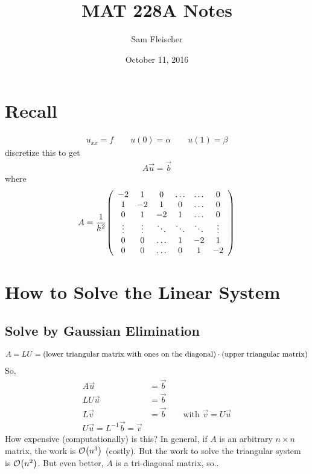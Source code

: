 \documentclass{article}
\title{MAT 228A Notes}
\author{Sam Fleischer}
\date{October 11, 2016}
\begin{document}
    \maketitle

    \section{Recall}
        \begin{align}
            u_{xx} = f \qquad u(0) = \alpha \qquad u(1) = \beta
        \end{align}
        discretize this to get
        \begin{align}
            A\vec{u} = \vec{b}
        \end{align}
        where
        \begin{align}
            A = \frac{1}{h^2}\qty(\begin{array}{cccccc}
                -2 & 1 & 0 & \dots & \dots & 0 \\
                1 & -2 & 1 & 0 & \dots & 0 \\
                0 & 1 & -2 & 1 & \dots & 0 \\
                \vdots & \vdots & \ddots & \ddots & \ddots & \vdots \\
                0 & 0 & \dots & 1 & -2 & 1 \\
                0 & 0 & \dots & 0 & 1 & -2
            \end{array})
        \end{align}

    \section{How to Solve the Linear System}
        \subsection{Solve by Gaussian Elimination}
            \begin{align}
                A = LU = \qty(\text{lower triangular matrix with ones on the diagonal})\cdot\qty(\text{upper triangular matrix})
            \end{align}
            So,
            \begin{align}
                A\vec{u} &= \vec{b} \\
                LU\vec{u} &= \vec{b} \\
                L\vec{v} &= \vec{b} \qquad \text{with } \vec{v} = U\vec{u} \\
                U\vec{u} = L^{-1}\vec{b} = \vec{v}
            \end{align}
            How expensive (computationally) is this?  In general, if $A$ is an arbitrary $n\times n$ matrix, the work is $\order{n^3}$ (costly).  But the work to solve the triangular system is $\order{n^2}$.  But even better, $A$ is a tri-diagonal matrix, so..
\end{document}
